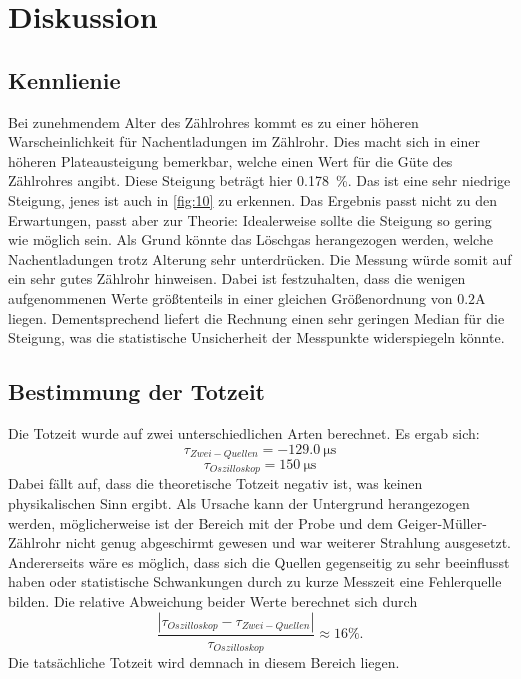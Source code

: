 \section{Diskussion}
\label{sec:Diskussion}

\subsection{Kennlienie}
Bei zunehmendem Alter des Zählrohres kommt es zu einer höheren Warscheinlichkeit 
für Nachentladungen im Zählrohr. Dies macht sich in einer höheren Plateausteigung 
bemerkbar, welche einen Wert für die Güte des Zählrohres angibt.
Diese Steigung beträgt hier \qty{0.178}{\%}. Das ist eine sehr niedrige Steigung,
jenes ist auch in \autoref{fig:10} zu erkennen. Das Ergebnis passt nicht zu 
den Erwartungen, passt aber zur Theorie: Idealerweise sollte die Steigung so 
gering wie möglich sein. Als Grund könnte das Löschgas herangezogen werden, 
welche Nachentladungen trotz Alterung sehr unterdrücken. Die Messung würde somit 
auf ein sehr gutes Zählrohr hinweisen. Dabei ist festzuhalten, dass die wenigen 
aufgenommenen Werte größtenteils in einer gleichen Größenordnung von $0.2 \unit{\ampere}$
liegen. Dementsprechend liefert die Rechnung einen sehr geringen Median für die 
Steigung, was die statistische Unsicherheit der Messpunkte widerspiegeln könnte.

\subsection{Bestimmung der Totzeit}
Die Totzeit wurde auf zwei unterschiedlichen Arten berechnet.
Es ergab sich: 
\begin{equation}
    \tau_{Zwei-Quellen} = \qty{-129.0}{\micro\second} 
\end{equation}
\begin{equation}
    \tau_{Oszilloskop} = \qty{150}{\micro\second} 
\end{equation}
\noindent Dabei fällt auf, dass die theoretische Totzeit negativ ist, was 
keinen physikalischen Sinn ergibt. Als Ursache kann der Untergrund herangezogen 
werden, möglicherweise ist der Bereich mit der Probe und dem Geiger-Müller-Zählrohr 
nicht genug abgeschirmt gewesen und war weiterer Strahlung ausgesetzt. Andererseits 
wäre es möglich, dass sich die Quellen gegenseitig zu sehr beeinflusst haben oder 
statistische Schwankungen durch zu kurze Messzeit eine Fehlerquelle bilden.
Die relative Abweichung beider Werte berechnet sich durch 
\begin{equation}
    \frac{|\tau_{Oszilloskop} - \tau_{Zwei-Quellen}|}{\tau_{Oszilloskop}} \approx 16 \%.
\end{equation}
Die tatsächliche Totzeit wird demnach in diesem Bereich liegen.